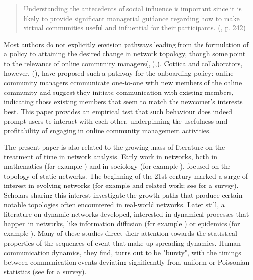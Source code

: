 \begin{quotation}
Understanding the antecedents of social influence is important since it is likely to provide significant managerial guidance regarding how to make virtual communities useful and influential for their participants. (\cite{dholakia2004social}, p. 242) 
\end{quotation}

Most authors do not explicitly envision pathways leading from the formulation of a policy to attaining the desired change in network topology, though some  point to the relevance of online community managers(\cite{dholakia2004social}, \cite{toral2009empirical}),\cite{rheingold1993virtual}). Cottica and collaborators, however, (\cite{cottica2015online}),  have proposed such a pathway for the onboarding policy: online community managers communicate one-to-one with new members of the online community and suggest they initiate communication with existing members, indicating those existing members that seem to match the newcomer's interests best. This paper provides an empirical test that such behaviour does indeed prompt users to interact with each other, underpinning the usefulness and profitability of engaging in online community management activities.  

The present paper is also related to the growing mass of literature on the treatment of time in network analysis. Early work in networks, both in mathematics (for example \cite{erdds1959random}) and in sociology (for example \cite{moreno1937sociometry}), focused on the topology of static networks. The beginning of the 21st century marked a surge of interest in evolving networks (for example \cite{barabasi1999emergence} and related work; see \cite{dorogovtsev2002evolution} for a survey). Scholars sharing this interest investigate the growth paths that produce certain notable topologies often encountered in real-world networks. Later still, a literature on dynamic networks developed, interested in dynamical processes that happen in networks, like information diffusion (for example \cite{eckmann2004entropy}) or epidemics (for example \cite{rocha2011simulated}). Many of these studies direct their attention towards the statistical properties of the sequences of event that make up spreading dynamics. Human communication dynamics, they find, turns out to be "bursty", with the timings between communication events deviating significantly from uniform or Poissonian statistics  (see \cite{holme2012temporal} for a survey). 

